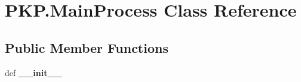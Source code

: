 \hypertarget{classPKP_1_1MainProcess}{\section{\-P\-K\-P.\-Main\-Process \-Class \-Reference}
\label{classPKP_1_1MainProcess}
}
\subsection*{\-Public \-Member \-Functions}
\begin{DoxyCompactItemize}
\item 
\hypertarget{classPKP_1_1MainProcess_a6d6efda2a163e1d8cb6f0d6cb79159e2}{def {\bfseries \-\_\-\-\_\-init\-\_\-\-\_\-}}\label{classPKP_1_1MainProcess_a6d6efda2a163e1d8cb6f0d6cb79159e2}


\end{DoxyCompactItemize}

